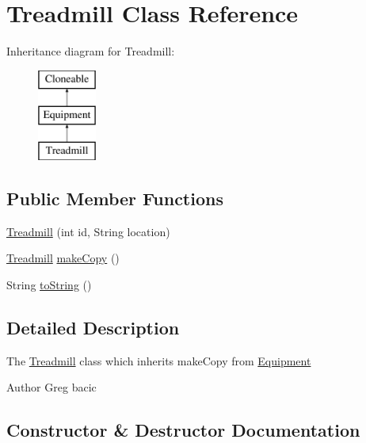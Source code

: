 \hypertarget{class_treadmill}{}\section{Treadmill Class Reference}
\label{class_treadmill}
Inheritance diagram for Treadmill\+:\begin{figure}[H]
\begin{center}
\leavevmode
\includegraphics[height=3.000000cm]{class_treadmill}
\end{center}
\end{figure}
\subsection*{Public Member Functions}
\begin{DoxyCompactItemize}
\item 
\hyperlink{class_treadmill_a73abf72303a3448bb81f572e4d29d595}{Treadmill} (int id, String location)
\item 
\hyperlink{class_treadmill}{Treadmill} \hyperlink{class_treadmill_a3431c4cc70cd2b6e9414df628eff7997}{make\+Copy} ()
\item 
String \hyperlink{class_treadmill_a73b6c456c73c8188db6c5d4deef1522e}{to\+String} ()
\end{DoxyCompactItemize}


\subsection{Detailed Description}
The \hyperlink{class_treadmill}{Treadmill} class which inherits make\+Copy from \hyperlink{interface_equipment}{Equipment} \begin{DoxyAuthor}{Author}
Greg bacic 
\end{DoxyAuthor}


\subsection{Constructor \& Destructor Documentation}
\hypertarget{class_treadmill_a73abf72303a3448bb81f572e4d29d595}{}
